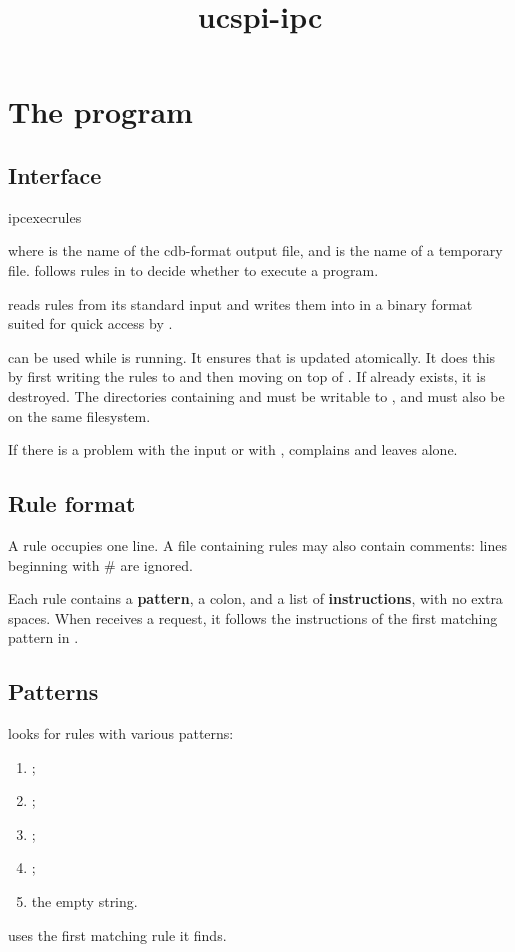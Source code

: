 \documentclass{book}
\title{ucspi-ipc}
\begin{document}
\section{The  program}

\subsection{Interface}
\begin{code}%
  ipcexecrules  
\end{code}
where  is the name of the cdb-format output file, and
 is the name of a temporary file.
 follows rules in  to decide whether to
execute a program.

 reads rules from its standard input and writes them
into  in a binary format suited for quick access by
.

 can be used while  is running.  It
ensures that  is updated atomically.  It does this by first
writing the rules to  and then moving  on top of
.  If  already exists, it is destroyed.  The
directories containing  and  must be writable to
, and must also be on the same filesystem.

If there is a problem with the input or with , 
complains and leaves  alone.

\subsection{Rule format}
A rule occupies one line.  A file containing rules may also contain
comments: lines beginning with \# are ignored.

Each rule contains a \textbf{pattern}, a colon, and a list of
\textbf{instructions}, with no extra spaces.  When  receives a
request, it follows the instructions of the first matching pattern in
.

\subsection{Patterns}
 looks for rules with various patterns:
\begin{enumerate}
\item {};
\item {};
\item {};
\item {};
\item the empty string.
\end{enumerate}
 uses the first matching rule it finds.
\end{document}
